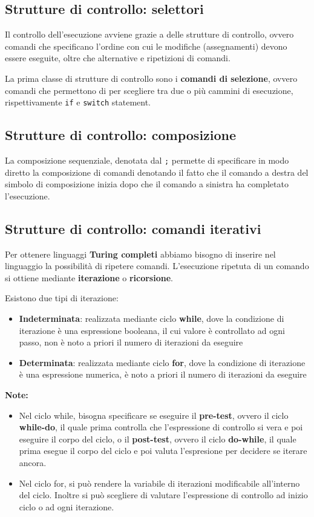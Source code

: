\documentclass[12pt,a4paper]{article}
\begin{document}
\subsection{Strutture di controllo: selettori}
Il controllo dell'esecuzione avviene grazie a delle strutture di controllo, ovvero comandi che specificano l'ordine con cui le modifiche (assegnamenti) devono essere eseguite, oltre che alternative e ripetizioni di comandi.

La prima classe di strutture di controllo sono i \textbf{comandi di selezione}, ovvero comandi che permettono di per scegliere tra due o più cammini di esecuzione, rispettivamente \texttt{if} e \texttt{switch} statement.

\subsection{Strutture di controllo: composizione}
La composizione sequenziale, denotata dal \texttt{;} permette di specificare in modo diretto la composizione di comandi denotando il fatto che il comando a destra del simbolo di composizione inizia dopo che il comando a sinistra ha completato l'esecuzione.

\subsection{Strutture di controllo: comandi iterativi}
Per ottenere linguaggi \textbf{Turing completi} abbiamo bisogno di inserire nel linguaggio la possibilità di ripetere comandi. L'esecuzione ripetuta di un comando si ottiene mediante \textbf{iterazione} o \textbf{ricorsione}.

Esistono due tipi di iterazione:
\begin{itemize}
\item \textbf{Indeterminata}: realizzata mediante ciclo \textbf{while}, dove la condizione di iterazione è una espressione booleana, il cui valore è controllato ad ogni passo, non è noto a priori il numero di iterazioni da eseguire
\item \textbf{Determinata}: realizzata mediante ciclo \textbf{for}, dove la condizione di iterazione è una espressione numerica, è noto a priori il numero di iterazioni da eseguire
\end{itemize}


\textbf{Note:}
\begin{itemize}
\item Nel ciclo while, bisogna specificare se eseguire il \textbf{pre-test}, ovvero il ciclo \textbf{while-do}, il quale prima controlla che l'espressione di controllo si vera e poi eseguire il corpo del ciclo, o il \textbf{post-test}, ovvero il ciclo \textbf{do-while}, il quale prima esegue il corpo del ciclo e poi valuta l'espresione per decidere se iterare ancora.
\item Nel ciclo for, si può rendere la variabile di iterazioni modificabile all'interno del ciclo. Inoltre si può scegliere di valutare l'espressione di controllo ad inizio ciclo o ad ogni iterazione.
\end{itemize}
\end{document}
